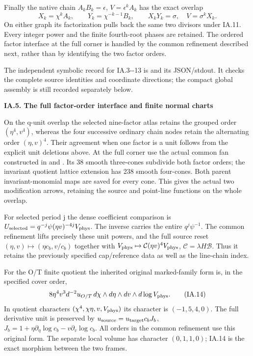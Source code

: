 Finally the native chain \(A_kB_k=\epsilon\),
\(V=\epsilon^kA_k\) has the exact overlap
\[
 X_k=\chi^kA_k,\qquad
 Y_k=\chi^{-k-1}B_k,
 \qquad X_kY_k=\sigma,\quad V=\sigma^kX_k.
\tag{IA.13}
\]
On either graph its factorization pulls back the same
two divisors under IA.11. Every integer power and the
finite fourth-root phases are retained. The ordered
factor interface at the full corner is handled by the
common refinement described next, rather than by
identifying the two factor orders.

The independent symbolic record for IA.3-\/-13 is
and its JSON/stdout. It checks the complete source
identities and coordinate directions; the compact
global assembly is still recorded separately below.

\par

\medskip\noindent\textbf{IA.5. The full factor-order interface and finite normal charts}

\par\nobreak

On the q-unit overlap the selected nine-factor atlas
retains the grouped order \((\eta^4,v^4)\), whereas the
four successive ordinary chain nodes retain the
alternating order \((\eta,v)^4\). Their agreement when
one factor is a unit follows from the explicit unit
deletions above. At the full corner use the actual
common fan constructed in
 and
.
Its 38 smooth three-cones subdivide both factor orders;
the invariant quotient lattice extension has 238 smooth
four-cones. Both parent invariant-monomial maps are
saved for every cone. This gives the actual two
modification arrows, retaining the source and point-line
functions on the whole overlap.

For selected period j the dense coefficient comparison
is \(U_{\rm selected}=q^{-j}\psi(\eta v)^{-4j}V_{\rm phys}\).
The inverse carries the entire \(q^j\psi^{-1}\).
The common refinement lifts precisely these unit powers,
and the full source reset
\((\eta,v)\mapsto(\eta c_b,v/c_b)\) together with
\(V_{\rm phys}\mapsto\mathcal C(\eta v)^4V_{\rm phys}\),
\(\mathcal C=\lambda H\mathcal B\). Thus it retains
the previously specified cap/reference data as well
as the line-chain index.

For the O/T finite quotient the inherited original
marked-family form is, in the specified cover order,
\[
 8\eta^4v^3d^{-2}u_{O/T}\,
 d\chi\wedge d\eta\wedge dv\wedge d\log V_{\rm phys}.
\tag{IA.14}
\]
In quotient characters \((\chi^4,\chi\eta,v,V_{\rm phys})\)
its character is \((-1,5,4,0)\). The full derivative
unit is preserved by
\(u_{\rm source}=u_{\rm target}c_bJ_b\),
\(J_b=1+\eta\partial_\eta\log c_b-v\partial_v\log c_b\).
All orders in the common refinement use this original
form. The separate local volume has character
\((0,1,1,0)\); IA.14 is the exact morphism between the
two frames.


